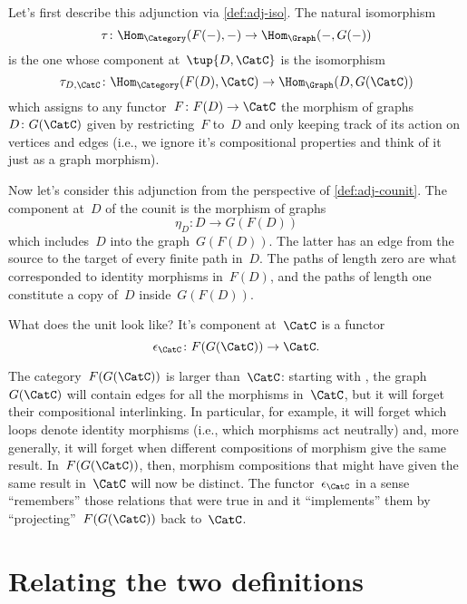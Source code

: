 Let's first describe this adjunction via \cref{def:adj-iso}. The natural isomorphism
\begin{equation*}
    \tau\colon \Hom_{\Category}(F(- ), - ) \to \Hom_{\Graph}(- , G( - ))
\end{equation*}
is the one whose component at~$\tup{D,\CatC}$ is the isomorphism
\begin{equation*}
    \tau_{D,\CatC} \colon \Hom_{\Category}(F(D), \CatC) \to \Hom_{\Graph}(D, G(\CatC))
\end{equation*}
which assigns to any functor~$F\colon F(D) \to \CatC$ the morphism of graphs~$D \colon G(\CatC)$ given by restricting~$F$ to~$D$ and only keeping track of its action on vertices and edges (i.e., we ignore it's compositional properties and think of it just as a graph morphism).

Now let's consider this adjunction from the perspective of \cref{def:adj-counit}. The component at~$D$ of the counit is the morphism of graphs
\begin{equation*}
    \eta_D \colon D \to  G(F(D))
\end{equation*}
which includes~$D$ into the graph~$G(F(D))$. The latter has an edge from the source to the target of every finite path in~$D$. The paths of length zero are what corresponded to identity morphisms in~$F(D)$, and the paths of length one constitute a copy of~$D$ inside~$G(F(D))$.

What does the unit look like? It's component at~$\CatC$ is a functor
\begin{equation*}
    \epsilon_{\CatC} \colon F(G(\CatC)) \to \CatC.
\end{equation*}

The category~$F(G(\CatC))$ is larger than~$\CatC$: starting with \CatC, the graph~$G(\CatC)$ will contain edges for all the morphisms in~$\CatC$, but it will forget their compositional interlinking. In particular, for example, it will forget which loops denote identity morphisms (i.e., which morphisms act neutrally) and, more generally, it will forget when different compositions of morphism give the same result. In~$F(G(\CatC))$, then, morphism compositions that might have given the same result in~$\CatC$ will now be distinct.
The functor~$\epsilon_{\CatC}$ in a sense ``remembers'' those relations that were true in \CatC and it ``implements'' them by ``projecting''~$F(G(\CatC))$ back to~$\CatC$.


\section{Relating the two definitions}
\label{relate-adj-defs}

